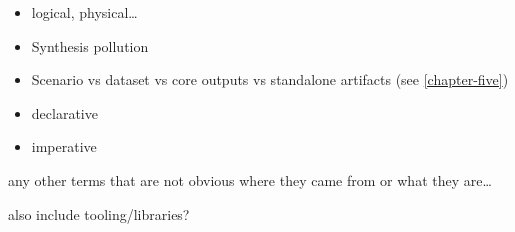 \begin{itemize}
\item
  logical, physical\ldots{}
\item
  Synthesis pollution
\item
  Scenario vs dataset vs core outputs vs standalone artifacts (see
  \autoref{chapter-five})
\item
  declarative
\item
  imperative
\end{itemize}

any other terms that are not obvious where they came from or what they
are\ldots{}

also include tooling/libraries?
